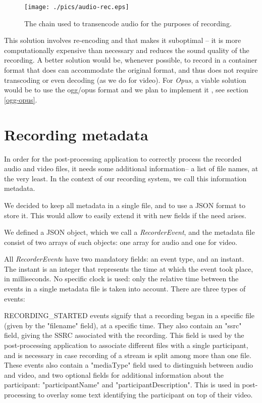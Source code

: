 \documentclass[twoside,openright,a4paper,12pt,english]{article}
\begin{document}
\begin{figure}[h]
    \texttt{[image: ./pics/audio-rec.eps]}
    \caption{The chain used to transencode audio for the purposes of recording.}
    \label{audio-rec}
\end{figure}

This solution involves re-encoding and that makes it suboptimal -- it is 
more computationally expensive than necessary and reduces the sound quality of the recording.
A better solution would be, whenever possible, to record in a container format
that does can accommodate the original format, and thus does not require
transcoding or even decoding (as we do for video). For \emph{Opus}, a viable
solution would be to use the ogg/opus format and we plan to implement it , see
section \ref{ogg-opus}.






\section{Recording metadata}
\label{recording-metadata}
In order for the post-processing application to correctly process the recorded
audio and video files, it needs some additional information-- a list of file
names, at the very least. In the context of our recording system, we call this information
metadata.

We decided to keep all metadata in a single file, and to use a JSON
format to store it. This would allow to easily extend it with new fields if
the need arises.

We defined a JSON object, which we call a \emph{RecorderEvent}, and the
metadata file consist of two arrays of such objects: one array for audio and
one for video.

All \emph{RecorderEvent}s have two mandatory fields: an event type, and an
instant. The instant is an integer that represents the time at which the event
took place, in milliseconds. No specific clock is used: only the relative time between
the events in a single metadata file is taken into account. There are three types of events:



\smallskip
RECORDING\_STARTED events signify that a recording began in a specific file
(given by the "filename" field), at a specific time. They also contain an "ssrc" field, giving the
SSRC associated with the recording. This field is used by the post-processing
application to associate different files with a single participant, and is
necessary in case recording of a stream is split among more than one file.
These events also contain a "mediaType" field used to distinguish between audio and
video, and two optional fields for additional information about the
participant: "participantName" and "participantDescription". This is used in
post-processing to overlay some text identifying the participant on top of
their video.
\end{document}
